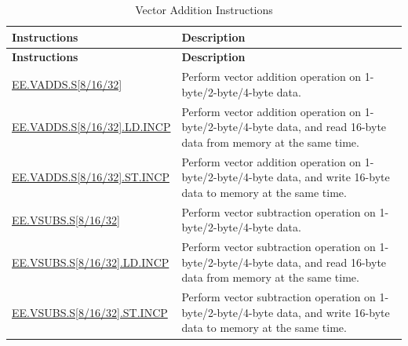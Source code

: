 \begin{longtable}[c]{|l|m{10cm}|}
    \caption{Vector Addition Instructions}
    \label{tab:pie-vadd-instructions}\\
    \hline
    \rowcolor{lightgray}
    \textbf{Instructions} & \textbf{Description} \\\hline
    \endfirsthead
    \rowcolor{lightgray}
    \textbf{Instructions} & \textbf{Description} \\\hline
    \endhead
    \endfoot
    
    \hyperref[instruction:EEVADDSS8]{EE.VADDS.S[8/16/32]} & Perform vector addition operation on 1-byte/2-byte/4-byte data.
    \\\hline
    \hyperref[instruction:EEVADDSS8LDINCP]{EE.VADDS.S[8/16/32].LD.INCP} & Perform vector addition operation on 1-byte/2-byte/4-byte data, and read 16-byte data from memory at the same time.
    \\\hline
    \hyperref[instruction:EEVADDSS8STINCP]{EE.VADDS.S[8/16/32].ST.INCP} & Perform vector addition operation on 1-byte/2-byte/4-byte data, and write 16-byte data to memory at the same time.
    \\\hline
    \hyperref[instruction:EEVSUBSS8]{EE.VSUBS.S[8/16/32]} & Perform vector subtraction operation on 1-byte/2-byte/4-byte data.
    \\\hline
    \hyperref[instruction:EEVSUBSS8LDINCP]{EE.VSUBS.S[8/16/32].LD.INCP} & Perform vector subtraction operation on 1-byte/2-byte/4-byte data, and read 16-byte data from memory at the same time.
    \\\hline
    \hyperref[instruction:EEVSUBSS8STINCP]{EE.VSUBS.S[8/16/32].ST.INCP} & Perform vector subtraction operation on 1-byte/2-byte/4-byte data, and write 16-byte data to memory at the same time.
    \\\hline
\end{longtable}